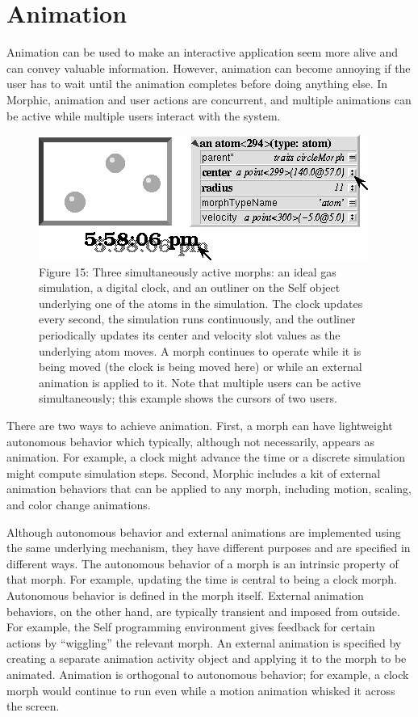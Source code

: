 \documentclass[letterpaper,10pt,english]{sphinxmanual}
\begin{document}
\section{Animation}
\label{morphic:animation}
Animation can be used to make an interactive application seem more alive and can convey valuable information. However, animation can become annoying if the user has to wait until the animation completes before doing anything else. In Morphic, animation and user actions are concurrent, and multiple animations can be active while multiple users interact with the system.
\begin{figure}[htbp]\begin{flushleft}
\capstart

\includegraphics{Figure15.png}
\caption{Figure 15: Three simultaneously active morphs: an ideal gas simulation, a digital clock, and an outliner on the Self object underlying one of the atoms in the simulation. The clock updates every second, the simulation runs continuously, and the outliner periodically updates its center and velocity slot values as the underlying atom moves. A morph continues to operate while it is being moved (the clock is being moved here) or while an external animation is applied to it. Note that multiple users can be active simultaneously; this example shows the cursors of two users.}\end{flushleft}\end{figure}

There are two ways to achieve animation. First, a morph can have lightweight autonomous behavior which typically, although not necessarily, appears as animation. For example, a clock might advance the time or a discrete simulation might compute simulation steps. Second, Morphic includes a kit of external animation behaviors that can be applied to any morph, including motion, scaling, and color change animations.

Although autonomous behavior and external animations are implemented using the same underlying mechanism, they have different purposes and are specified in different ways. The autonomous behavior of a morph is an intrinsic property of that morph. For example, updating the time is central to being a clock morph. Autonomous behavior is defined in the morph itself. External animation behaviors, on the other hand, are typically transient and imposed from outside. For example, the Self programming environment gives feedback for certain actions by ``wiggling'' the relevant morph. An external animation is specified by creating a separate animation activity object and applying it to the morph to be animated. Animation is orthogonal to autonomous behavior; for example, a clock morph would continue to run even while a motion animation whisked it across the screen.
\end{document}
